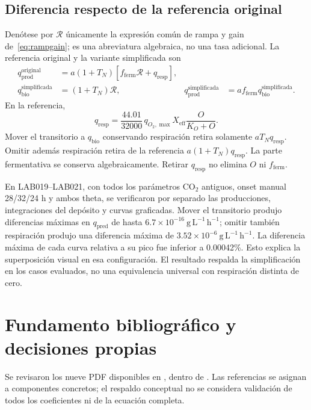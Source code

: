 \documentclass[11pt,a4paper]{article}
\newcommand{\qbio}{q_{\mathrm{bio}}}
\newcommand{\qprod}{q_{\mathrm{prod}}}
\newcommand{\qpred}{q_{\mathrm{pred}}}
\newcommand{\qresp}{q_{\mathrm{resp}}}
\newcommand{\fferm}{f_{\mathrm{ferm}}}
\begin{document}
\subsection{Diferencia respecto de la referencia original}

Denótese por $\mathcal R$ únicamente la expresión común de rampa y gain
de~\eqref{eq:rampgain}; es una abreviatura algebraica, no una tasa adicional.
La referencia original y la variante simplificada son
\begin{align}
\qprod^{\mathrm{original}}&=a(1+T_N)[\fferm\mathcal R+\qresp],\label{eq:original}\\
\qbio^{\mathrm{simplificada}}&=(1+T_N)\mathcal R,&
\qprod^{\mathrm{simplificada}}&=a\fferm\qbio^{\mathrm{simplificada}}.\label{eq:simplified}
\end{align}
En la referencia,
\begin{equation}
\qresp=\frac{44.01}{32000}\,
q_{O_2,\max}X_{\mathrm{eff}}\frac{O}{K_O+O}.
\label{eq:oldresp}
\end{equation}
Mover el transitorio a $\qbio$ conservando respiración retira solamente
$aT_N\qresp$. Omitir además respiración retira de la referencia
$a(1+T_N)\qresp$. La parte fermentativa se conserva algebraicamente.
Retirar $\qresp$ no elimina $O$ ni $\fferm$.

En LAB019--LAB021, con todos los parámetros CO\(_2\) antiguos, onset manual
28/32/24 h y ambos theta, se verificaron por separado las producciones,
integraciones del depósito y curvas graficadas. Mover el transitorio produjo
diferencias máximas en $\qpred$ de hasta
$6.7\times10^{-16}\ \mathrm{g\,L^{-1}\,h^{-1}}$; omitir también respiración
produjo una diferencia máxima de
$3.52\times10^{-6}\ \mathrm{g\,L^{-1}\,h^{-1}}$.
La diferencia máxima de cada curva relativa a su pico fue inferior a
0.00042\%. Esto explica la superposición visual en esa configuración.
El resultado respalda la simplificación en los casos evaluados, no una
equivalencia universal con respiración distinta de cero.

\section{Fundamento bibliográfico y decisiones propias}
\label{sec:bases}

Se revisaron los nueve PDF disponibles en
, dentro de .
Las referencias se asignan a componentes concretos; el respaldo conceptual
no se considera validación de todos los coeficientes ni de la ecuación completa.
\end{document}

